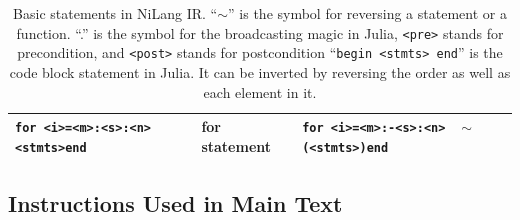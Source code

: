 \documentclass{article}
\newcommand{\<}{\langle}
\renewcommand{\>}{\rangle}
\newcommand{\cquad}{{{ }_{\quad}}}
\theoremstyle{definition}\newtheorem{definition}{\textit{Definition}}
\begin{document}
\begin{table}[h!]
\begin{minipage}{\columnwidth}
{\begin{tabularx}{\textwidth}{X X X}
            \hline
            \texttt{for <i>=<m>:<s>:<n>}\newline $\cquad$\texttt{<stmts>}\newline \texttt{end} & for statement & \texttt{for <i>=<m>:-<s>:<n>}\newline $\cquad$ \texttt{$\sim$(<stmts>)}\newline \texttt{end}\\
            \bottomrule
        \end{tabularx}
    }
    \caption{Basic statements in NiLang IR.
    ``$\sim$'' is the symbol for reversing a statement or a function.
    ``.'' is the symbol for the broadcasting magic in Julia,
    \texttt{<pre>} stands for precondition, and \texttt{<post>} stands for postcondition
``\texttt{begin <stmts> end}'' is the code block statement in Julia.
It can be inverted by reversing the order as well as each element in it.
}\label{tbl:revstatements}
\end{minipage}
\end{table}

\newpage
\subsection{Instructions Used in Main Text}\label{app:instr}
\end{document}
